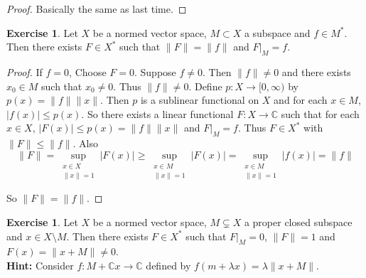 \documentclass[12pt]{amsart}
\theoremstyle{definition}
\newtheorem{ex}[definition]{Exercise}
\newcommand{\lam}{\lambda}
\newcommand{\C}{\mathbb{C}}
\newcommand{\Rg}{[0,\infty)}
\newcommand{\lex}[1]{\label{ex:#1}}
\begin{document}
	\begin{proof}
	Basically the same as last time.
	\end{proof}
	
	\begin{ex} \lex{55016}
		Let $X$ be a normed vector space, $M \subset X$ a subspace and $f \in M^*$. Then there exists $F \in X^*$ such that $\|F \|= \|f \|$ and $F|_M = f$.  
	\end{ex}
	
	\begin{proof}
		If $f =0$, Choose $F=0$. Suppose $f \neq 0$. Then $\|f \|\neq 0$ and there exists $x_0 \in M$ such that $x_0  \neq 0$. Thus $\|f \| \neq 0$. Define $p:X \rightarrow \Rg$ by $ p(x) = \|f \|\|x \|$. Then $p$ is a sublinear functional on $X$ and for each $x \in M$, $\vert f(x) \vert \leq p(x)$. So there exists a linear functional $F:X \rightarrow \C$ such that for each $x \in X$, $\vert F(x) \vert \leq p(x) = \|f \|\|x \|$ and $F|_M = f$. Thus $F \in X^*$ with $\|F \|\leq \|f \|$. Also $$\|F \|= \sup_{\substack{ x \in X \\ \|x \|= 1}} \vert F(x) \vert \geq  \sup_{\substack{ x \in M \\ \|x \|= 1}} \vert F(x) \vert = \sup_{\substack{ x \in M \\ \|x \|= 1}} \vert f(x) \vert = \|f \|$$
		
		So $\|F \|= \|f \|$.
	\end{proof}
	
	\begin{ex} \lex{55017}
		Let $X$ be a normed vector space, $M \subsetneq X$ a proper closed subspace and $x \in X \setminus M$. Then there exists $F \in X^*$ such that $F|_M = 0$, $\|F \|=1$ and $ F(x) = \|x+M \|\neq 0$. \\
		\textbf{Hint:} Consider $f:M+\C x \rightarrow \C$ defined by $f(m+\lam x) = \lam \|x +M \|$.
	\end{ex}
	
\end{document}

